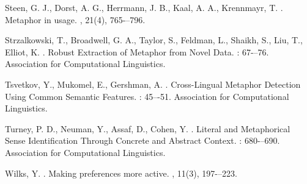 \documentclass[11pt]{article}
\begin{document}
\begin{thebibliography}{}
Steen, G. J., Dorst, A. G., Herrmann, J. B., Kaal, A. A., Krennmayr, T. 
.
\newblock Metaphor in usage.
, 21(4), 765-–796.

Strzalkowski, T., Broadwell, G. A., Taylor, S., Feldman, L., Shaikh, S., Liu, T., Elliot, K. 
.
\newblock Robust Extraction of Metaphor from Novel Data.
: 67-–76. Association for Computational Linguistics.

Tsvetkov, Y., Mukomel, E., Gershman, A. 
.
\newblock Cross-Lingual Metaphor Detection Using Common Semantic Features.
: 45–-51. Association for Computational Linguistics.

Turney, P. D., Neuman, Y., Assaf, D., Cohen, Y. 
.
\newblock Literal and Metaphorical Sense Identification Through Concrete and Abstract Context.
: 680-–690. Association for Computational Linguistics.

Wilks, Y. 
.
\newblock Making preferences more active.
, 11(3), 197-–223.

\end{thebibliography}
\end{document}
